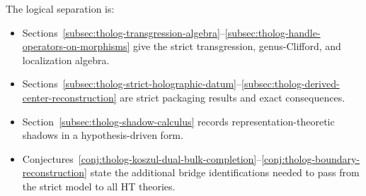 \begin{remark}
The logical separation is:
\begin{itemize}
\item Sections~\ref{subsec:tholog-transgression-algebra}--\ref{subsec:tholog-handle-operators-on-morphisms} give the strict transgression, genus-Clifford, and localization algebra.
\item Sections~\ref{subsec:tholog-strict-holographic-datum}--\ref{subsec:tholog-derived-center-reconstruction} are strict packaging results and exact consequences.
\item Section~\ref{subsec:tholog-shadow-calculus} records representation-theoretic shadows in a hypothesis-driven form.
\item Conjectures~\ref{conj:tholog-koszul-dual-bulk-completion}--\ref{conj:tholog-boundary-reconstruction} state the additional bridge identifications needed to pass from the strict model to all HT theories.
\end{itemize}
\end{remark}

